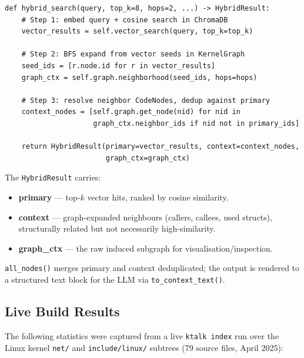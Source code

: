 \documentclass[11pt,a4paper]{article}
\newcommand{\coderef}[1]{\texttt{\small\color{layer2}#1}}
\begin{document}
\begin{tcolorbox}[
  colback=mirror!5, colframe=mirror!50, arc=4pt,
  title={\small\ttfamily KernelStore.hybrid\_search() --- dual-retrieval pipeline},
  fonttitle=\bfseries\small\color{mirror!70!black}
]
\begin{lstlisting}
def hybrid_search(query, top_k=8, hops=2, ...) -> HybridResult:
    # Step 1: embed query + cosine search in ChromaDB
    vector_results = self.vector_search(query, top_k=top_k)

    # Step 2: BFS expand from vector seeds in KernelGraph
    seed_ids = [r.node.id for r in vector_results]
    graph_ctx = self.graph.neighborhood(seed_ids, hops=hops)

    # Step 3: resolve neighbor CodeNodes, dedup against primary
    context_nodes = [self.graph.get_node(nid) for nid in
                     graph_ctx.neighbor_ids if nid not in primary_ids]

    return HybridResult(primary=vector_results, context=context_nodes,
                        graph_ctx=graph_ctx)
\end{lstlisting}
\end{tcolorbox}

\noindent
The \coderef{HybridResult} carries:
\begin{itemize}[itemsep=1pt]
  \item \textbf{primary} --- top-$k$ vector hits, ranked by cosine similarity.
  \item \textbf{context} --- graph-expanded neighbours (callers, callees, used
        structs), structurally related but not necessarily high-similarity.
  \item \textbf{graph\_ctx} --- the raw induced subgraph for visualisation/inspection.
\end{itemize}

\noindent
\texttt{all\_nodes()} merges primary and context deduplicated; the output is
rendered to a structured text block for the LLM via \texttt{to\_context\_text()}.

\subsection{Live Build Results}
\label{sec:build-results}

The following statistics were captured from a live \texttt{ktalk index} run
over the Linux kernel \texttt{net/} and \texttt{include/linux/} subtrees
(79 source files, April 2025):
\end{document}
